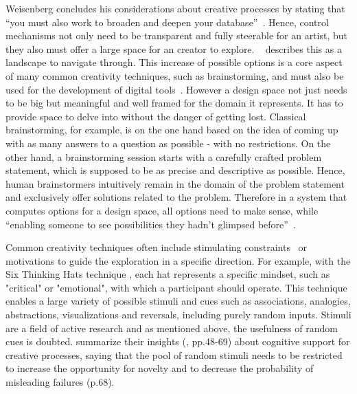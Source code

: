 Weisenberg concludes his considerations about creative processes by stating that ``you must also work to broaden and deepen your database''~\cite{markman_2009_tis}. Hence, control mechanisms not only need to be transparent and fully steerable for an artist, but they also must offer a large space for an creator to explore. \citeauthor*{boden_2010_cat}~\cite{boden_2010_cat} describes this as a landscape to navigate through. This increase of possible options is a core aspect of many common creativity techniques, such as brainstorming, and must also be used for the development of digital tools~\cite{terry_2004_vea}.
However a design space not just needs to be big but meaningful and well framed for the domain it represents. It has to provide space to delve into without the danger of getting lost. Classical brainstorming, for example, is on the one hand based on the idea of coming up with as many answers to a question as possible - with no restrictions. On the other hand, a brainstorming session starts with a carefully crafted problem statement, which is supposed to be as precise and descriptive as possible. Hence, human brainstormers intuitively remain in the domain of the problem statement and exclusively offer solutions related to the problem. Therefore in a system that computes options for a design space, all options need to make sense, while ``enabling someone to see possibilities they hadn't glimpsed before''~\cite{boden_2010_cat}. 

Common creativity techniques often include stimulating constraints~\cite{onarheim_2010_occ,shih_2011_buc,biskjaer_2014_cud,stokes_2005_ccp} or motivations to guide the exploration in a specific direction. For example, with the Six Thinking Hats technique \cite{debono_1985_sth}, each hat represents a specific mindset, such as "critical" or "emotional", with which a participant should operate. This technique enables a large variety of possible stimuli and cues such as associations, analogies, abstractions, visualizations and reversals, including purely random inputs. Stimuli are a field of active research and as mentioned above, the usefulness of random cues is doubted. \citeauthor*{markman_2009_tis} summarize their insights (\cite{markman_2009_tis}, pp.48-69) about cognitive support for creative processes, saying that the pool of random stimuli needs to be restricted to increase the opportunity for novelty and to decrease the probability of misleading failures (p.68).

